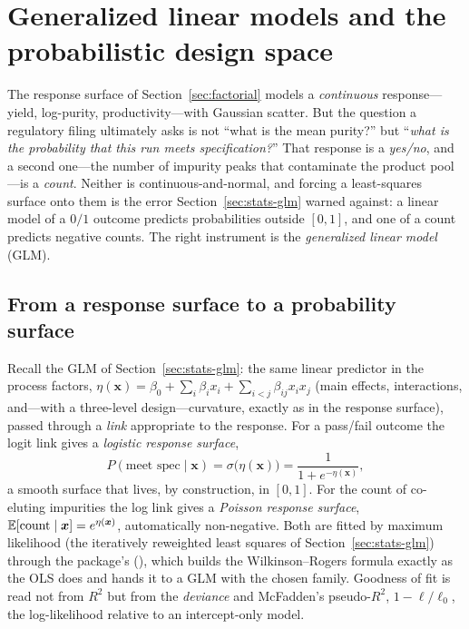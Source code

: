 \section{Generalized linear models and the probabilistic design space}
\label{sec:glm}

The response surface of Section~\ref{sec:factorial} models a \emph{continuous}
response---yield, log-purity, productivity---with Gaussian scatter. But the
question a regulatory filing ultimately asks is not ``what is the mean purity?''
but ``\emph{what is the probability that this run meets specification?}'' That
response is a \emph{yes/no}, and a second one---the number of impurity peaks that
contaminate the product pool---is a \emph{count}. Neither is continuous-and-normal,
and forcing a least-squares surface onto them is the error
Section~\ref{sec:stats-glm} warned against: a linear model of a $0/1$ outcome
predicts probabilities outside $[0,1]$, and one of a count predicts negative
counts. The right instrument is the \emph{generalized linear model} (GLM).

\subsection{From a response surface to a probability surface}

Recall the GLM of Section~\ref{sec:stats-glm}: the same linear predictor in the
process factors, $\eta(\bm x)=\beta_0+\sum_i\beta_i x_i+\sum_{i<j}\beta_{ij}x_ix_j$
(main effects, interactions, and---with a three-level design---curvature, exactly
as in the response surface), passed through a \emph{link} appropriate to the
response. For a pass/fail outcome the logit link gives a \emph{logistic
response surface},
%
\begin{equation}
P(\text{meet spec}\mid\bm x) = \sigma\!\bigl(\eta(\bm x)\bigr)
   = \frac{1}{1+e^{-\eta(\bm x)}},
\label{eq:glm-logit}
\end{equation}
%
a smooth surface that lives, by construction, in $[0,1]$. For the count of
co-eluting impurities the log link gives a \emph{Poisson response surface},
$\mathbb{E}[\text{count}\mid\bm x]=e^{\eta(\bm x)}$, automatically non-negative. Both are
fitted by maximum likelihood (the iteratively reweighted least squares of
Section~\ref{sec:stats-glm}) through the package's 
(), which builds the Wilkinson--Rogers formula exactly as
the OLS  does and hands it to a  GLM
with the chosen family. Goodness of fit is read not from $R^2$ but from the
\emph{deviance} and McFadden's pseudo-$R^2$, $1-\ell/\ell_0$, the log-likelihood
relative to an intercept-only model.

